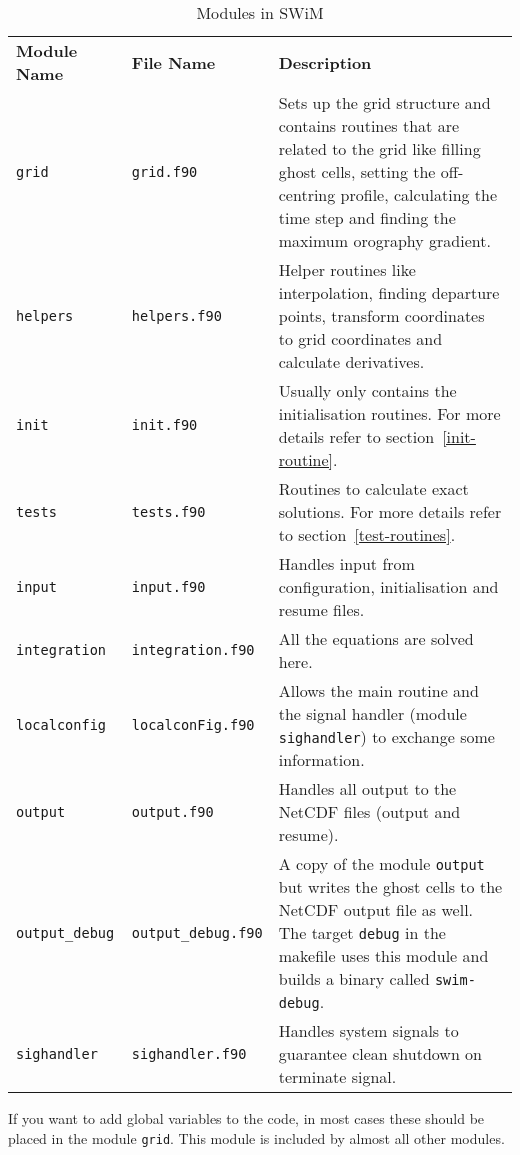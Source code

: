 \documentclass[11pt,a4paper,openright,twoside]{book}
\newcommand{\thecodenospace}{SWiM}
\newcommand{\thecode}{\thecodenospace{ }}
\begin{document}
\begin{table}[H]
  \begin{tabular}{p{25mm}p{30mm}p{60mm}}
    \textbf{Module Name} & \textbf{File Name} & \textbf{Description} \\
    \texttt{grid} & \texttt{grid.f90} & Sets up the grid structure and contains routines that are related to the grid like filling ghost cells, setting the off-centring profile, calculating the time step and finding the maximum orography gradient.\\
    \texttt{helpers} & \texttt{helpers.f90} & Helper routines like interpolation, finding departure points, transform coordinates to grid coordinates and calculate derivatives.\\
    \texttt{init} & \texttt{init.f90} & Usually only contains the initialisation routines. For more details refer to section~\ref{init-routine}.\\
    \texttt{tests} & \texttt{tests.f90} & Routines to calculate exact solutions. For more details refer to section~\ref{test-routines}.\\
    \texttt{input} & \texttt{input.f90} & Handles input from configuration, initialisation and resume files. \\
    \texttt{integration} & \texttt{integration.f90} & All the equations are solved here.\\
    \texttt{localconfig} & \texttt{localconFig.f90} & Allows the main routine and the signal handler (module \texttt{sighandler}) to exchange some information.\\
    \texttt{output} & \texttt{output.f90} & Handles all output to the NetCDF files (output and resume).\\
    \texttt{output\_debug} & \texttt{output\_debug.f90} & A copy of the module \texttt{output} but writes the ghost cells to the NetCDF output file as well. The target \texttt{debug} in the makefile uses this module and builds a binary called \texttt{swim-debug}.\\
    \texttt{sighandler} & \texttt{sighandler.f90} & Handles system signals to guarantee clean shutdown on terminate signal.
  \end{tabular}
  \caption{Modules in \thecode}
  \label{modules}
\end{table}

If you want to add global variables to the code, in most cases these should be placed in the module \texttt{grid}. This module
is included by almost all other modules.
\end{document}
